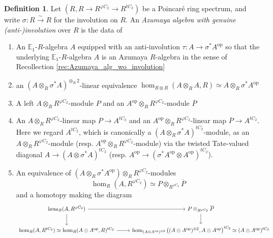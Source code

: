 \documentclass{article}
\newcommand{\EE}{\mathbb{E}}
\newcommand{\op}{\mathrm{op}} %
\theoremstyle{definition}
\newtheorem{definition}[equation]{Definition}
\begin{document}
\begin{definition}\label{defn:Azumaya_genuine_anti-inv}
    Let $ (R, R \to R^{\varphi C_2} \to R^{tC_2}) $ be a Poincaré ring spectrum, and write $ \sigma \colon R \xrightarrow{\sim} R $ for the involution on $ R $. 
    An \emph{Azumaya algebra with genuine (anti-)involution} over $ R $ is the data of 
    \begin{enumerate}[label=(\alph*)]
        \item \label{defnitem:Azumaya_alg_gi_the_involution} An $ \EE_1 $-$ R $-algebra $ A $ equipped with an anti-involution $ \tau \colon A \to \sigma^* A^\op $ so that the underlying $ \EE_1 $-$ R $-algebra $ A $ is an Azumaya $ R $-algebra in the sense of Recollection \ref{rec:Azumaya_alg_wo_involution} 
        \item \label{defnitem:Azumaya_alg_gi_underlying} an $ (A \otimes_R \sigma^* A)^{\otimes_R 2} $-linear equivalence $ \hom_{R \otimes R}(A \otimes_R A, R) \simeq A \otimes_R \sigma^* A^\op $
        \item A left $ A \otimes_{R} R^{\varphi C_2} $-module $ P $ and an $ A^\op \otimes_R R^{\varphi C_2} $-module $ \overline{P} $
        \item \label{defn_item:Azumaya_gen_inv_conn_map} An $ A \otimes_R R^{\varphi C_2} $-linear map $ P \to A^{tC_2} $ and an $ A^\op \otimes_R R^{\varphi C_2} $-linear map $ \overline{P} \to A^{tC_2} $. 
        Here we regard $ A^{tC_2} $, which is canonically a $ (A \otimes_R \sigma^* A)^{tC_2} $-module, as an $ A \otimes_R R^{\varphi C_2} $-module (resp. $ A^\op \otimes_R R^{\varphi C_2} $-module) via the twisted Tate-valued diagonal $ A \to (A \otimes \sigma^* A)^{tC_2} $ (resp. $ A^\op \to (\sigma^* A^\op \otimes A^\op)^{tC_2} $). 
        \item \label{defn_item:Azumaya_gen_inv_geom_fixpt} An equivalence of $ \left(A \otimes_R \sigma^* A^\op\right) \otimes_R R^{\varphi C_2} $-modules 
        \begin{equation*}
            \hom_R(A, R^{\varphi C_2}) \simeq P \otimes_{R^{\varphi C_2}} \overline{P}
        \end{equation*}
        and a homotopy making the diagram 
        \begin{equation*}
        \begin{tikzcd}
            \hom_R(A, R^{\varphi C_2}) \ar[r] \ar[d] & P \otimes_{R^{\varphi C_2}} \overline{P} \ar[d] \\
            \hom_R(A, R^{tC_2}) \simeq \hom_R(A \otimes A^\op, R)^{tC_2} \ar[r] & \hom_{(A \otimes A^\op)^{\otimes 2}}\left((A \otimes A^\op)^{\otimes 2}, A \otimes A^\op\right)^{tC_2} \simeq (A \otimes A^\op)^{tC_2}

\end{tikzcd}
\end{equation*}
\end{enumerate}
\end{definition}
\end{document}
